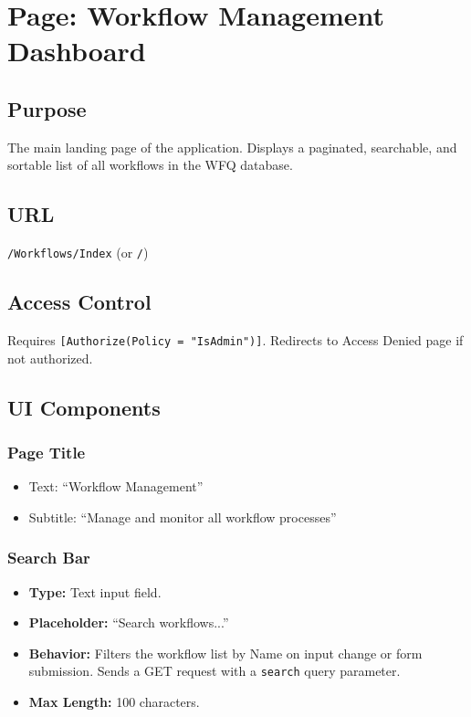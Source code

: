 \documentclass[12pt]{article}
\begin{document}
\section{Page: Workflow Management Dashboard}

\subsection{Purpose}
The main landing page of the application. Displays a paginated, searchable, and sortable list
of all workflows in the WFQ database.

\subsection{URL}
\texttt{/Workflows/Index} (or \texttt{/})

\subsection{Access Control}
Requires \texttt{[Authorize(Policy = "IsAdmin")]}. Redirects to Access Denied page if not
authorized.

\subsection{UI Components}

\subsubsection{Page Title}
\begin{itemize}
    \item Text: ``Workflow Management''
    \item Subtitle: ``Manage and monitor all workflow processes''
\end{itemize}

\subsubsection{Search Bar}
\begin{itemize}
    \item \textbf{Type:} Text input field.
    \item \textbf{Placeholder:} ``Search workflows...''
    \item \textbf{Behavior:} Filters the workflow list by Name on input change or form
    submission. Sends a GET request with a \texttt{search} query parameter.
    \item \textbf{Max Length:} 100 characters.
\end{itemize}
\end{document}
